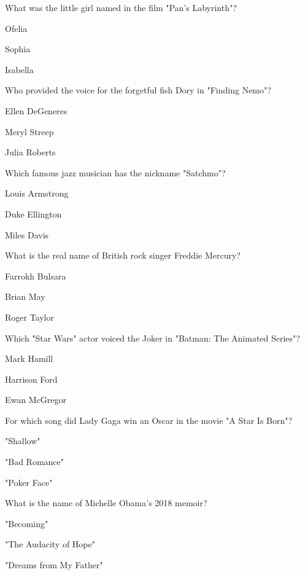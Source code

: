 \begin{enhancedmcq}{What was the little girl named in the film "Pan's Labyrinth"?}
\item Ofelia
\item Sophia
\item Isabella

\end{enhancedmcq}
\begin{enhancedmcq}{Who provided the voice for the forgetful fish Dory in "Finding Nemo"?}
\item Ellen DeGeneres
\item Meryl Streep
\item Julia Roberts

\end{enhancedmcq}
\begin{enhancedmcq}{Which famous jazz musician has the nickname "Satchmo"?}
\item Louis Armstrong
\item Duke Ellington
\item Miles Davis

\end{enhancedmcq}
\begin{enhancedmcq}{What is the real name of British rock singer Freddie Mercury?}
\item Farrokh Bulsara
\item Brian May
\item Roger Taylor

\end{enhancedmcq}
\begin{enhancedmcq}{Which "Star Wars" actor voiced the Joker in "Batman: The Animated Series"?}
\item Mark Hamill
\item Harrison Ford
\item Ewan McGregor

\end{enhancedmcq}
\begin{enhancedmcq}{For which song did Lady Gaga win an Oscar in the movie "A Star Is Born"?}
\item "Shallow"
\item "Bad Romance"
\item "Poker Face"

\end{enhancedmcq}
\begin{enhancedmcq}{What is the name of Michelle Obama's 2018 memoir?}
\item "Becoming"
\item "The Audacity of Hope"
\item "Dreams from My Father"

\end{enhancedmcq}
